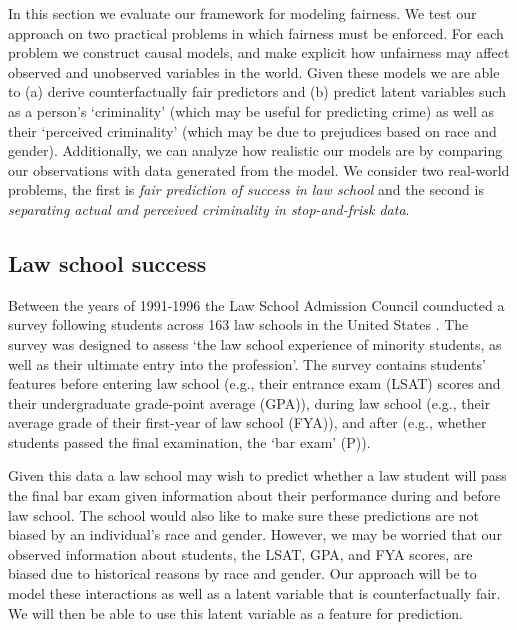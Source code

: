 In this section we evaluate our framework for modeling fairness. We test our approach on two practical problems in which fairness must be enforced. For each problem we construct causal models, and make explicit how unfairness may affect observed and unobserved variables in the world. Given these models we are able to (a) derive counterfactually fair predictors and (b) predict latent variables such as a person's `criminality' (which may be useful for predicting crime) as well as their `perceived criminality' (which may be due to prejudices based on race and gender). Additionally, we can analyze how realistic our models are by comparing our observations with data generated from the model. We consider two real-world problems, the first is \emph{fair prediction of success in law school} and the second is \emph{separating actual and perceived criminality in stop-and-frisk data}.

\subsection{Law school success}
Between the years of 1991-1996 the Law School Admission Council counducted a survey following students across 163 law schools in the United States \cite{wightman1998lsac}. The survey was designed to assess `the law school experience of minority students, as well as their ultimate entry into the profession'. The survey contains students' features before entering law school (e.g., their entrance exam (LSAT) scores and their undergraduate grade-point average (GPA)), during law school (e.g., their average grade of their first-year of law school (FYA)), and after (e.g., whether students passed the final examination, the `bar exam' (P)). 

Given this data a law school may wish to predict whether a law student will pass the final bar exam given information about their performance during and before law school. The school would also like to make sure these predictions are not biased by an individual's race and gender. However, we may be worried that our observed information about students, the LSAT, GPA, and FYA scores, are biased due to historical reasons by race and gender. Our approach will be to model these interactions as well as a latent variable that is counterfactually fair. We will then be able to use this latent variable as a feature for prediction.

